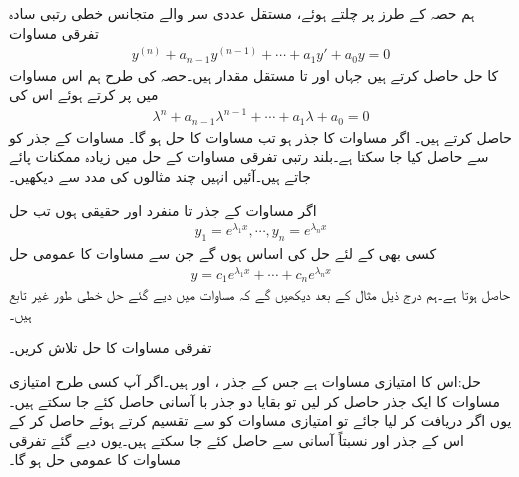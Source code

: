 ہم حصہ  کے طرز پر چلتے ہوئے، مستقل عددی سر والے متجانس خطی  رتبی  سادہ تفرقی مساوات
\begin{align}\label{مساوات_سادہ_بلند_مستقل_سر_متجانس_الف}
y^{(n)}+a_{n-1}y^{(n-1)}+\cdots+a_1y'+a_0y=0
\end{align}
کا حل حاصل کرتے ہیں جہاں  اور  تا  مستقل مقدار ہیں۔حصہ  کی طرح ہم اس مساوات میں  پر کرتے ہوئے اس کی  
\begin{align}\label{مساوات_سادہ_بلند_مستقل_سر_متجانس_ب}
\lambda^n+a_{n-1}\lambda^{n-1}+\cdots+a_1 \lambda+a_0=0
\end{align}
حاصل کرتے ہیں۔ اگر  مساوات  کا جذر ہو تب  مساوات  کا حل ہو گا۔ مساوات  کے جذر کو  سے حاصل کیا جا سکتا ہے۔بلند رتبی  تفرقی مساوات کے حل میں زیادہ ممکنات پائے جاتے ہیں۔آئیں انہیں چند مثالوں کی مدد سے دیکھیں۔

اگر مساوات  کے  جذر  تا  منفرد اور حقیقی ہوں  تب حل
\begin{align}\label{مساوات_سادہ_بلند_مستقل_سر_متجانس_پ}
y_1=e^{\lambda_1 x}, \cdots , y_n=e^{\lambda_n x}
\end{align}
کسی بھی  کے لئے حل کی اساس ہوں گے جن سے مساوات  کا عمومی حل
\begin{align}\label{مساوات_سادہ_بلند_مستقل_سر_متجانس_ت}
y=c_1 e^{\lambda_1 x}+\cdots+c_n e^{\lambda_n x}
\end{align}
حاصل ہوتا ہے۔ہم درج ذیل مثال کے بعد دیکھیں گے کہ مساوات  میں دیے گئے حل خطی طور غیر تابع ہیں۔

تفرقی مساوات  کا حل تلاش کریں۔

حل:اس کا امتیازی مساوات  ہے جس کے جذر ،  اور  ہیں۔اگر آپ کسی طرح امتیازی مساوات کا ایک جذر حاصل کر لیں تو بقایا دو جذر با آسانی حاصل کئے جا سکتے ہیں۔یوں اگر  دریافت کر لیا جائے تو امتیازی مساوات کو  سے تقسیم کرتے ہوئے   حاصل کر کے اس کے جذر  اور  نسبتاً آسانی سے حاصل کئے جا سکتے ہیں۔یوں دیے گئے تفرقی مساوات کا  عمومی حل  ہو گا۔

